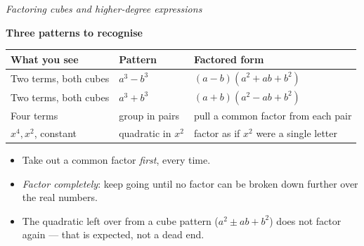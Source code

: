 \documentclass[12pt]{article}
\begin{document}

\begin{center}
{\small\textit{Factoring cubes and higher-degree expressions}}
\end{center}

\vspace{0.15cm}
\noindent\textbf{Three patterns to recognise}

\vspace{0.1cm}
\begin{center}
\begin{tabular}{|l|l|l|}
\hline
\textbf{What you see} & \textbf{Pattern} & \textbf{Factored form} \\ \hline
Two terms, both cubes
  & $a^{3} - b^{3}$
  & $(a - b)(a^{2} + ab + b^{2})$ \\ \hline
Two terms, both cubes
  & $a^{3} + b^{3}$
  & $(a + b)(a^{2} - ab + b^{2})$ \\ \hline
Four terms
  & group in pairs
  & pull a common factor from each pair \\ \hline
$x^{4}, x^{2}$, constant
  & quadratic in $x^{2}$
  & factor as if $x^{2}$ were a single letter \\ \hline
\end{tabular}
\end{center}

\vspace{0.1cm}
\begin{itemize}[leftmargin=0.7cm, itemsep=1pt, topsep=3pt]
  \item Take out a common factor \emph{first}, every time.
  \item \emph{Factor completely}: keep going until no factor can be broken down
    further over the real numbers.
  \item The quadratic left over from a cube pattern
    ($a^{2} \pm ab + b^{2}$) does not factor again --- that is expected, not a
    dead end.
\end{itemize}

\vspace{0.2cm}




\end{document}
